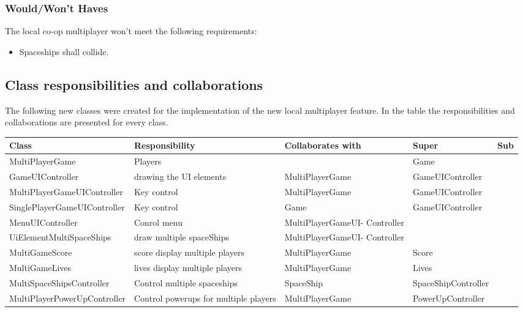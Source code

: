 \subsubsection{Would/Won't Haves}
The local co-op multiplayer won't meet the following requirements:
\begin{itemize}
	\item Spaceships shall collide.
\end{itemize}
\newpage

\subsection{Class responsibilities and collaborations}


The following new classes were created for the implementation of the new local multiplayer feature.
In the table the responsibilities and collaborations are presented for every class.
\begin{center}
    \begin{tabular}{ | p{4.5cm} | p{3cm} | p{3cm} | p{3cm} | p{1cm} |}
  \hline
    Class & Responsibility & Collaborates with & Super & Sub \\ \hline
   MultiPlayerGame & Players  & & Game & \\ \hline
   GameUIController & drawing the UI elements & MultiPlayerGame  & GameUIController  & \\ \hline
 MultiPlayerGameUIController & Key control & MultiPlayerGame  & GameUIController  & \\ \hline
 SinglePlayerGameUIController & Key control & Game  & GameUIController  & \\ \hline
   MenuUIController& Conrol menu & MultiPlayerGameUI- Controller  &   &  \\ \hline
   UiElementMultiSpaceShips& draw multiple spaceShips & MultiPlayerGameUI- Controller  &  &  \\ \hline
 MultiGameScore & score display multiple players &  MultiPlayerGame  &  Score  & \\ \hline
 MultiGameLives &  lives display multiple players & MultiPlayerGame  & Lives  & \\ \hline
 MultiSpaceShipsController& Control multiple spaceships & SpaceShip  & SpaceShipController &  \\ \hline
 MultiPlayerPowerUpController& Control powerups for multiple players & MultiPlayerGame   & PowerUpController &  \\ \hline

    \end{tabular}
\end{center}

